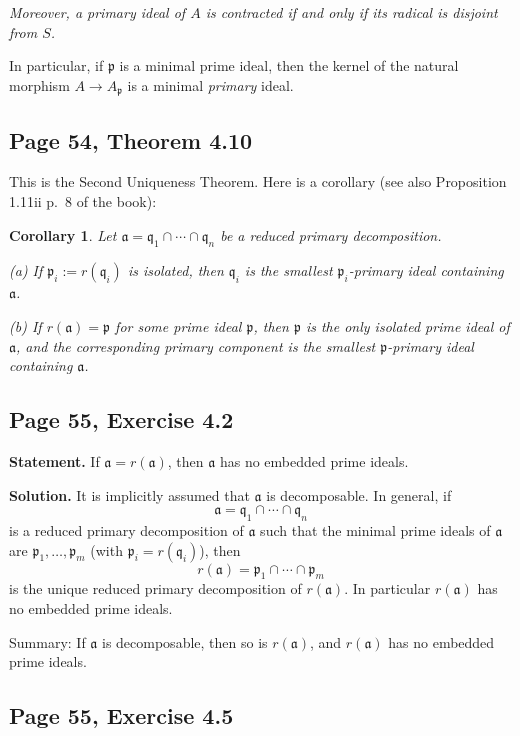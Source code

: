 \documentclass[parskip=half,fontsize=12pt]{scrartcl}%
\newcommand{\mf}{\mathfrak}
\newcommand{\aaa}{\mf a}
\newcommand{\ppp}{\mf p}
\newcommand{\qqq}{\mf q}
\newtheorem{cor}[thm]{Corollary}
\begin{document}
\emph{Moreover, a primary ideal of $A$ is contracted if and only if its radical is disjoint from $S$.}

In particular, if $\ppp$ is a minimal prime ideal, then the kernel of the natural morphism $A\to A_\ppp$ is a minimal \emph{primary} ideal.


\subsection{Page 54, Theorem 4.10}%

This is the Second Uniqueness Theorem. Here is a corollary (see also Proposition 1.11ii p.~8 of the book):

\begin{cor}\label{410}
Let $\aaa=\qqq_1\cap\cdots\cap\qqq_n$ be a reduced primary decomposition.

(a) If $\ppp_i:=r(\qqq_i)$ is isolated, then $\qqq_i$ is the smallest $\ppp_i$-primary ideal containing $\aaa$.%

(b) If $r(\aaa)=\ppp$ for some prime ideal $\ppp$, then $\ppp$ is the only isolated prime ideal of $\aaa$, and the corresponding primary component is the smallest $\ppp$-primary ideal containing $\aaa$.
\end{cor}

\subsection{Page 55, Exercise 4.2}%

\textbf{Statement.} If $\aaa=r(\aaa)$, then $\aaa$ has no embedded prime ideals.

\textbf{Solution.} It is implicitly assumed that $\aaa$ is decomposable. In general, if 
$$
\aaa=\qqq_1\cap\cdots\cap\qqq_n
$$ 
is a reduced primary decomposition of $\aaa$ such that the minimal prime ideals of $\aaa$ are $\ppp_1,\dots,\ppp_m$ (with $\ppp_i=r(\qqq_i)$), then 
$$
r(\aaa)=\ppp_1\cap\cdots\cap\ppp_m
$$ 
is the unique reduced primary decomposition of $r(\aaa)$. In particular $r(\aaa)$ has no embedded prime ideals. 

Summary: If $\aaa$ is decomposable, then so is $r(\aaa)$, and $r(\aaa)$ has no embedded prime ideals. 

\subsection{Page 55, Exercise 4.5}%
\end{document}
